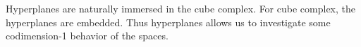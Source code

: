 Hyperplanes are naturally immersed in the cube complex. For \CATz cube complex, the hyperplanes are embedded. Thus hyperplanes allows us to investigate some codimension-1 behavior of the spaces.







